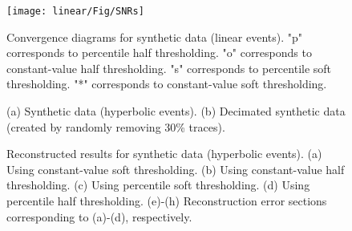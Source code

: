 {\begin{figure}[htb!]
  \centering
  \texttt{[image: linear/Fig/SNRs]}

	\caption{Convergence diagrams for synthetic data (linear events). "p" corresponds to percentile half thresholding. "o" corresponds to constant-value half thresholding. "s" corresponds to percentile soft thresholding. "*" corresponds to constant-value soft thresholding. }
	    \label{fig:SNRs}
\end{figure}


\begin{figure}[htb!]
  \centering
	\caption{(a) Synthetic data (hyperbolic events). (b) Decimated synthetic data (created by randomly removing 30\% traces). }
   \label{fig:hyper,hyper-zero}
\end{figure}


\begin{figure}[htb!]
  \centering
	\caption{Reconstructed results for synthetic data (hyperbolic events). (a) Using constant-value soft thresholding. (b) Using constant-value half thresholding.  (c) Using percentile soft thresholding. (d) Using percentile half thresholding.  (e)-(h) Reconstruction error sections corresponding to (a)-(d), respectively.}
   \label{fig:hyper-data2,hyper-data3,hyper-data5,hyper-data6,hyper-diff2,hyper-diff3,hyper-diff5,hyper-diff6}
\end{figure}

}
